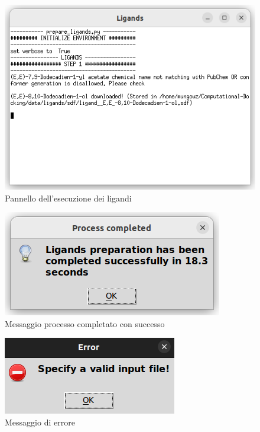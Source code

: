 \begin{figure}[H]
    \centering
    \includegraphics[scale=0.8]{immagini/capitolo3/ligandsExecution.png}
    \caption{Pannello dell'esecuzione dei ligandi}
    \label{fig:ligands execution}
\end{figure}

\begin{figure}[H]
    \centering
    \includegraphics{immagini/capitolo3/progressCompletedLigands.png}
    \caption{Messaggio processo completato con successo}
    \label{fig:progress completed ligands}
\end{figure}

\begin{figure}[H]
    \centering
    \includegraphics{immagini/capitolo3/invalidInputLigands.png}
    \caption{Messaggio di errore}
    \label{fig:invalid input ligands}
\end{figure}

